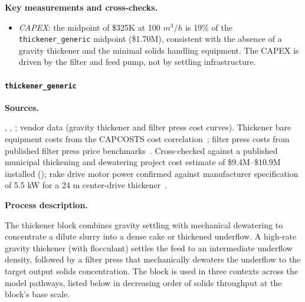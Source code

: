 \medskip
\noindent\textbf{Key measurements and cross-checks.}\quad

\begin{itemize}[noitemsep]
	\item \textit{CAPEX}: the midpoint of \$325K at 100 $\si{m^3/h}$ is 19\% of the \texttt{thickener\_generic} midpoint (\$1.70M), consistent with the absence of a gravity thickener and the minimal solids handling equipment. The CAPEX is driven by the filter and feed pump, not by settling infrastructure.
\end{itemize}

\clearpage
\paragraph{\texttt{thickener\_generic}}\label{app:04-methods-blockdefs-thickener}

\medskip
\noindent\textbf{Sources.}\quad

\citet{sgscanadaincSK1300Technical2024}, \citet{petersPlantDesignEconomics1991}, \citet{mularCAPCOSTS1998}; vendor data (gravity thickener and filter press cost curves). Thickener bare equipment costs from the CAPCOSTS cost correlation~\citep{mularCAPCOSTSHandbookEstimating1998}; filter press costs from published filter press price benchmarks~\citep{porvooIndustrialFilterPress2025}. Cross-checked against a published municipal thickening and dewatering project cost estimate of \$9.4M--\$10.9M installed (\citet{cleargovCostEstimateDraft}); rake drive motor power confirmed against manufacturer specification of 5.5 kW for a 24 m center-drive thickener~\cite{jinhaominingHotItemLarge}. 


\medskip
\noindent\textbf{Process description.}\quad

The thickener block combines gravity settling with mechanical dewatering to concentrate a dilute slurry into a dense cake or thickened underflow. A high-rate gravity thickener (with flocculant) settles the feed to an intermediate underflow density, followed by a filter press that mechanically dewaters the underflow to the target output solids concentration. The block is used in three contexts across the model pathways, listed below in decreasing order of solids throughput at the block's base scale. 

